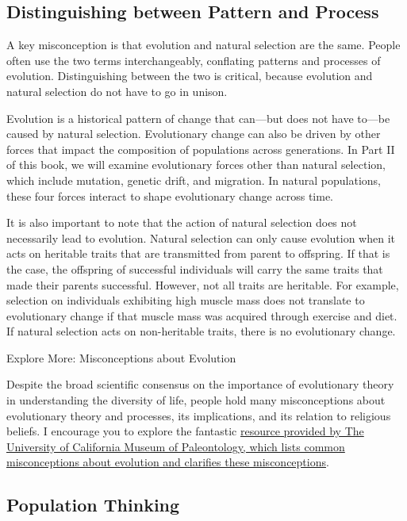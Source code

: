 \documentclass[
]{book}
\begin{document}
\hypertarget{distinguishing-between-pattern-and-process}{%
\subsection{Distinguishing between Pattern and Process}\label{distinguishing-between-pattern-and-process}}

A key misconception is that evolution and natural selection are the same. People often use the two terms interchangeably, conflating patterns and processes of evolution. Distinguishing between the two is critical, because evolution and natural selection do not have to go in unison.

Evolution is a historical pattern of change that can---but does not have to---be caused by natural selection. Evolutionary change can also be driven by other forces that impact the composition of populations across generations. In Part II of this book, we will examine evolutionary forces other than natural selection, which include mutation, genetic drift, and migration. In natural populations, these four forces interact to shape evolutionary change across time.

It is also important to note that the action of natural selection does not necessarily lead to evolution. Natural selection can only cause evolution when it acts on heritable traits that are transmitted from parent to offspring. If that is the case, the offspring of successful individuals will carry the same traits that made their parents successful. However, not all traits are heritable. For example, selection on individuals exhibiting high muscle mass does not translate to evolutionary change if that muscle mass was acquired through exercise and diet. If natural selection acts on non-heritable traits, there is no evolutionary change.

Explore More: Misconceptions about Evolution

Despite the broad scientific consensus on the importance of evolutionary theory in understanding the diversity of life, people hold many misconceptions about evolutionary theory and processes, its implications, and its relation to religious beliefs. I encourage you to explore the fantastic \href{https://evolution.berkeley.edu/evolibrary/misconceptions_faq.php}{resource provided by The University of California Museum of Paleontology, which lists common misconceptions about evolution and clarifies these misconceptions}.

\hypertarget{population-thinking}{%
\subsection{Population Thinking}\label{population-thinking}}
\end{document}
